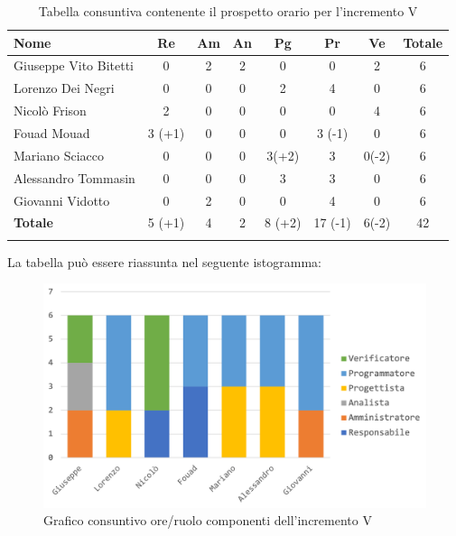 			\begin{longtable}{|l|c|c|c|c|c|c|c|}
				\hline
				\rowcolor{lighter-grayer}
				\textbf{Nome} & \textbf{Re} & \textbf{Am} & \textbf{An} & \textbf{Pg}  & \textbf{Pr}   & \textbf{Ve} & \textbf{Totale} \\
				\hline
				\endfirsthead
				\hline
				Giuseppe Vito Bitetti & 0 & 2 & 2 & 0 & 0 & 2 & 6\\
				\hline
				\hline
				Lorenzo Dei Negri & 0 & 0 & 0 & 2 & 4 & 0 & 6\\
				\hline
				\hline
				Nicolò Frison & 2 & 0 & 0 & 0 & 0 & 4 & 6\\
				\hline
				\hline
				Fouad Mouad & 3 (+1) & 0 & 0 & 0 & 3 (-1) & 0 & 6 \\
				\hline
				\hline
				Mariano Sciacco & 0 & 0 & 0 & 3(+2) & 3 & 0(-2) & 6\\
				\hline
				\hline
				Alessandro Tommasin & 0 & 0 & 0 & 3 & 3 & 0 & 6\\
				\hline
				\hline
				Giovanni Vidotto & 0 & 2 & 0 & 0 & 4 & 0 & 6\\
				\hline 
				\textbf{Totale} & 5 (+1) & 4 & 2 & 8 (+2) & 17 (-1) & 6(-2) & 42 \\
				\hline 
				
				\caption{Tabella consuntiva contenente il prospetto orario per l'incremento V}
			\end{longtable}	
			
			La tabella può essere riassunta nel seguente istogramma:
			
			\begin{figure}[H]
				\centering
				\includegraphics[width=0.8\linewidth]{images/consuntivo/ConsIncr5-1.png}
				\caption{Grafico consuntivo ore/ruolo componenti dell'incremento V}
				\label{fig:consuntivo grafico suddivisione ruoli incremento V}
			\end{figure}
			\pagebreak
			
